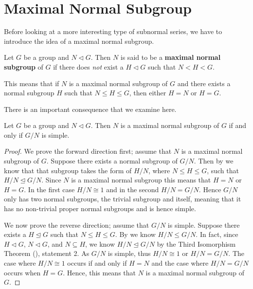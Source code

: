 \section{Maximal Normal Subgroup}
Before looking at a more interesting type of subnormal series, we have to introduce the idea of a maximal normal subgroup.
\begin{definition}
    Let $G$ be a group and $N \lhd G$. Then $N$ is said to be a \textbf{maximal normal subgroup} of $G$ if there does \textit{not} exist a $H \lhd G$ such that $N < H < G$.
\end{definition}
\begin{remark}
    This means that if $N$ is a maximal normal subgroup of $G$ and there exists a normal subgroup $H$ such that $N \leq H \leq G$, then either $H = N$ or $H = G$.
\end{remark}

There is an important consequence that we examine here.
\begin{theorem}\label{thrm-maximal-normal-subgroup-iff-quotient-is-simple}
    Let $G$ be a group and $N \lhd G$. Then $N$ is a maximal normal subgroup of $G$ if and only if $G/N$ is simple.
\end{theorem}

\begin{proof}
    We prove the forward direction first; assume that $N$ is a maximal normal subgroup of $G$. Suppose there exists a normal subgroup of $G/N$. Then by  we know that that subgroup takes the form of $H/N$, where $N \leq H \leq G$, such that $H/N \unlhd G/N$. Since $N$ is a maximal normal subgroup this means that $H = N$ or $H = G$. In the first case $H/N \cong 1$ and in the second $H / N = G/N$. Hence $G/N$ only has two normal subgroups, the trivial subgroup and itself, meaning that it has no non-trivial proper normal subgroups and is hence simple.

    We now prove the reverse direction; assume that $G/N$ is simple. Suppose there exists a $H \unlhd G$ such that $N \leq H \leq G$. By  we know $H/N \leq G/N$. In fact, since $H \lhd G$, $N \lhd G$, and $N \subseteq H$, we know $H/N \unlhd G/N$ by the Third Isomorphism Theorem (), statement 2. As $G/N$ is simple, thus $H/N \cong 1$ or $H/N = G/N$. The case where $H/N \cong 1$ occurs if and only if $H = N$ and the case where $H/N = G/N$ occurs when $H = G$. Hence, this means that $N$ is a maximal normal subgroup of $G$.
\end{proof}

